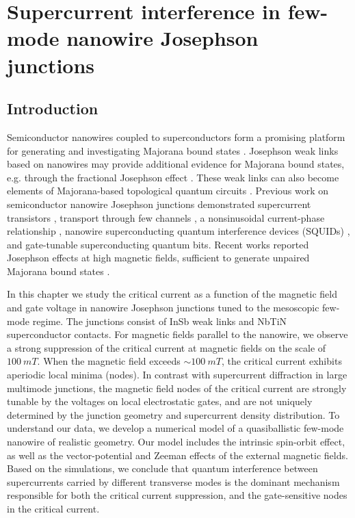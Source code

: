 \chapter{Supercurrent interference in few-mode nanowire Josephson junctions}
\label{ch:supercurrent}

\newpage
\noindent 
\section{Introduction}

Semiconductor nanowires coupled to superconductors form a promising platform for generating and investigating Majorana bound states \cite{Kitaev2001,Oreg2010,Lutchyn2010,Mourik2012,Deng2016,Albrecht2016Chen2017}. 
Josephson weak links based on nanowires may provide additional evidence for Majorana bound states, e.g. through the fractional Josephson effect \cite{Wiedenmann2015,Bocquillon2016,Deacon2017}. 
These weak links can also become elements of Majorana-based topological quantum circuits \cite{Hyart2013, Aasen2016, Karzig2017, Plugge2017}.
Previous work on semiconductor nanowire Josephson junctions demonstrated supercurrent transistors \cite{Doh2005}, transport through few channels \cite{Goffman2017}, a nonsinusoidal current-phase relationship \cite{Spanton2017}, nanowire superconducting quantum interference devices (SQUIDs) \cite{VanDam2006,Szombati2016}, and gate-tunable superconducting quantum bits\cite{Lange2015,Larsen2015}.
Recent works reported Josephson effects at high magnetic fields, sufficient to generate unpaired Majorana bound states \cite{Szombati2016,Paajaste2015,Tiira2017,Gharavi2017}.

In this chapter we study the critical current as a function of the magnetic field and gate voltage in nanowire Josephson junctions tuned to the mesoscopic few-mode regime.
The junctions consist of InSb weak links and NbTiN superconductor contacts.
For magnetic fields parallel to the nanowire, we observe a strong suppression of the critical current at magnetic fields on the scale of $\SI{100}{mT}$. 
When the magnetic field exceeds $\sim \SI{100}{mT}$, the critical current exhibits aperiodic local minima (nodes). 
In contrast with supercurrent diffraction in large multimode junctions, the magnetic field nodes of the critical current are strongly tunable by the voltages on local electrostatic gates, and are not uniquely determined by the junction geometry and supercurrent density distribution. 
To understand our data, we develop a numerical model of a quasiballistic few-mode nanowire of realistic geometry.
Our model includes the intrinsic spin-orbit effect, as well as the vector-potential and Zeeman effects of the external magnetic fields. 
Based on the simulations, we conclude that quantum interference between supercurrents carried by different transverse modes is the dominant mechanism responsible for both the critical current suppression, and the gate-sensitive nodes in the critical current.

